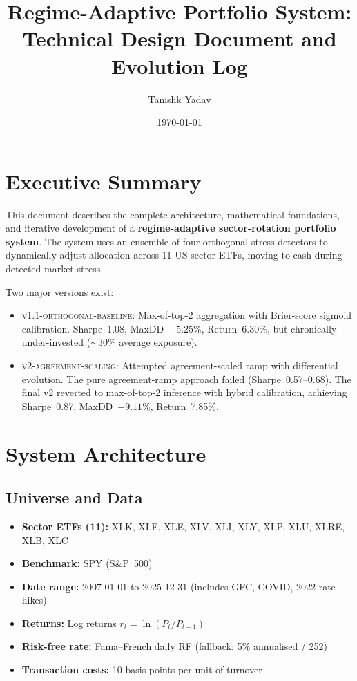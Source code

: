 \documentclass[11pt,a4paper]{article}
\title{Regime-Adaptive Portfolio System:\\Technical Design Document and Evolution Log}
\author{Tanishk Yadav}
\date{\today}
\newcommand{\versmark}[1]{\textsc{#1}}
\begin{document}
\maketitle
\tableofcontents
\newpage

\section{Executive Summary}

This document describes the complete architecture, mathematical foundations, and iterative development of a \textbf{regime-adaptive sector-rotation portfolio system}. The system uses an ensemble of four orthogonal stress detectors to dynamically adjust allocation across 11 US sector ETFs, moving to cash during detected market stress.

Two major versions exist:

\begin{itemize}
  \item \versmark{v1.1-orthogonal-baseline}: Max-of-top-2 aggregation with Brier-score sigmoid calibration. Sharpe~1.08, MaxDD~$-5.25\%$, Return~6.30\%, but chronically under-invested ($\sim$30\% average exposure).
  \item \versmark{v2-agreement-scaling}: Attempted agreement-scaled ramp with differential evolution. The pure agreement-ramp approach failed (Sharpe~0.57--0.68). The final v2 reverted to max-of-top-2 inference with hybrid calibration, achieving Sharpe~0.87, MaxDD~$-9.11\%$, Return~7.85\%.
\end{itemize}

\section{System Architecture}

\subsection{Universe and Data}

\begin{itemize}[nosep]
  \item \textbf{Sector ETFs (11):} XLK, XLF, XLE, XLV, XLI, XLY, XLP, XLU, XLRE, XLB, XLC
  \item \textbf{Benchmark:} SPY (S\&P~500)
  \item \textbf{Date range:} 2007-01-01 to 2025-12-31 (includes GFC, COVID, 2022 rate hikes)
  \item \textbf{Returns:} Log returns $r_t = \ln(P_t / P_{t-1})$
  \item \textbf{Risk-free rate:} Fama--French daily RF (fallback: 5\% annualised / 252)
  \item \textbf{Transaction costs:} 10 basis points per unit of turnover
\end{itemize}
\end{document}
